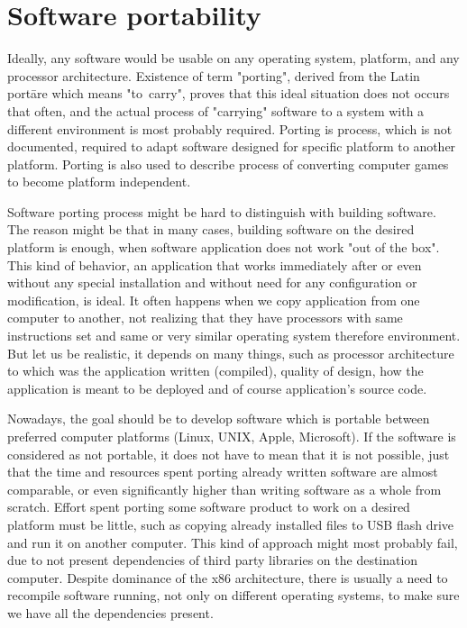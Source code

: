 \chapter{Software portability}\label{porting}

Ideally, any software would be usable on any operating system, platform, and any processor architecture.
Existence of term "porting", derived from the Latin portāre which means "to~carry", proves that this ideal situation does not occurs that often, and the actual process of "carrying" software to a system with a different environment is most probably required.
Porting is process, which is not documented, required to adapt software designed for specific platform to another platform. %
Porting is also used to describe process of converting computer games to become platform independent\cite{wiki_porting}.

Software porting process might be hard to distinguish with building software.
The reason might be that in many cases, building software on the desired platform is enough, when software application does not work "out of the box".
This kind of behavior, an application that works immediately after or even without any special installation and without need for any configuration or modification, is ideal.
It often happens when we copy application from one computer to another, not realizing that they have processors with same instructions set and same or very similar operating system therefore environment. %
But let us be realistic, it depends on many things, such as processor architecture to which was the application written (compiled), quality of design, how the application is meant to be deployed and of course application's source code.

Nowadays, the goal should be to develop software which is portable between preferred computer platforms (Linux, UNIX, Apple, Microsoft).
If the software is considered as not portable, it does not have to mean that it is not possible, just that the time and resources spent porting already written software are almost comparable, or even significantly higher than writing software as a whole from scratch. %
Effort spent porting some software product to work on a desired platform must be little, such as copying already installed files to USB flash drive and run it on another computer.
This kind of approach might most probably fail, due to not present dependencies of third party libraries on the destination computer.
Despite dominance of the x86 architecture, there is usually a need to recompile software running, not only on different operating systems, to make sure we have all the dependencies present.

